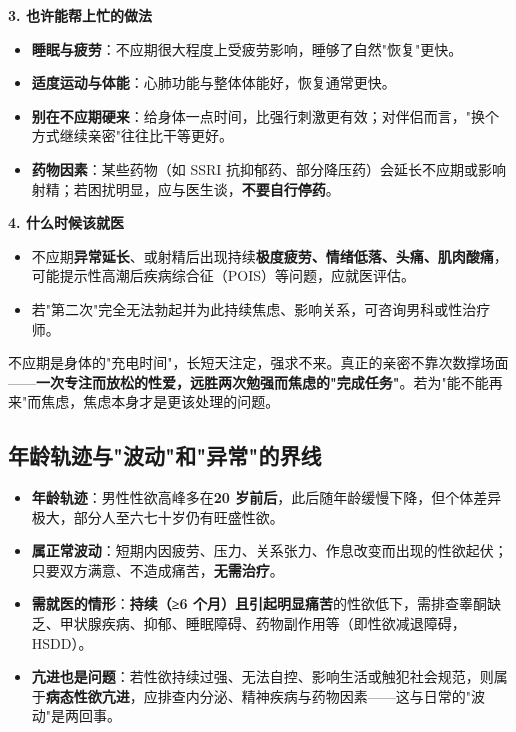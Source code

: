 \noindent\textbf{3. 也许能帮上忙的做法}

\begin{itemize}
	\item \textbf{睡眠与疲劳}：不应期很大程度上受疲劳影响，睡够了自然"恢复"更快。
	\item \textbf{适度运动与体能}：心肺功能与整体体能好，恢复通常更快。
	\item \textbf{别在不应期硬来}：给身体一点时间，比强行刺激更有效；对伴侣而言，"换个方式继续亲密"往往比干等更好。
	\item \textbf{药物因素}：某些药物（如 SSRI 抗抑郁药、部分降压药）会延长不应期或影响射精；若困扰明显，应与医生谈，\textbf{不要自行停药}。
\end{itemize}

\noindent\textbf{4. 什么时候该就医}

\begin{itemize}
	\item 不应期\textbf{异常延长}、或射精后出现持续\textbf{极度疲劳、情绪低落、头痛、肌肉酸痛}，可能提示性高潮后疾病综合征（POIS）等问题，应就医评估。
	\item 若"第二次"完全无法勃起并为此持续焦虑、影响关系，可咨询男科或性治疗师。
\end{itemize}

\begin{tcolorbox}[colback=pink!5!white,colframe=red!50!black,title=贴心小叮咛]
不应期是身体的"充电时间"，长短天注定，强求不来。真正的亲密不靠次数撑场面——\textbf{一次专注而放松的性爱，远胜两次勉强而焦虑的"完成任务"}。若为"能不能再来"而焦虑，焦虑本身才是更该处理的问题。
\end{tcolorbox}

\subsection{年龄轨迹与"波动"和"异常"的界线}

\begin{itemize}
	\item \textbf{年龄轨迹}：男性性欲高峰多在\textbf{20 岁前后}，此后随年龄缓慢下降，但个体差异极大，部分人至六七十岁仍有旺盛性欲。
	\item \textbf{属正常波动}：短期内因疲劳、压力、关系张力、作息改变而出现的性欲起伏；只要双方满意、不造成痛苦，\textbf{无需治疗}。
	\item \textbf{需就医的情形}：\textbf{持续（≥6 个月）且引起明显痛苦}的性欲低下，需排查睾酮缺乏、甲状腺疾病、抑郁、睡眠障碍、药物副作用等（即性欲减退障碍，HSDD）。
	\item \textbf{亢进也是问题}：若性欲持续过强、无法自控、影响生活或触犯社会规范，则属于\textbf{病态性欲亢进}，应排查内分泌、精神疾病与药物因素——这与日常的"波动"是两回事。
\end{itemize}

